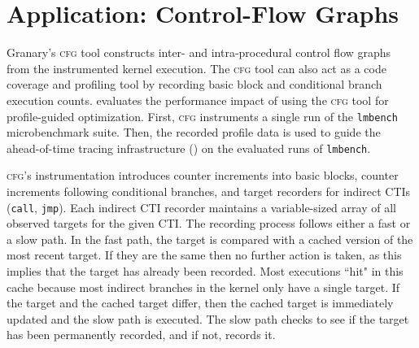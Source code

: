 \documentclass[preprint]{sigplanconf}
\newcommand{\toolname}[1]{{\scshape #1}}
\begin{document}





\section{Application: Control-Flow Graphs}\label{sec:cfg}
Granary's \toolname{cfg} tool constructs inter- and intra-procedural control flow graphs from the instrumented kernel execution. The \toolname{cfg} tool can also act as a code coverage and profiling tool by recording basic block and conditional branch execution counts.  evaluates the performance impact of using the \toolname{cfg} tool for profile-guided optimization. First, \toolname{cfg} instruments a single run of the \texttt{lmbench} microbenchmark suite. Then, the recorded profile data is used to guide the ahead-of-time tracing infrastructure () on the evaluated runs of \texttt{lmbench}.

\toolname{cfg}'s instrumentation introduces counter increments into basic blocks, counter increments following conditional branches, and target recorders for indirect CTIs (\texttt{call}, \texttt{jmp}). Each indirect CTI recorder maintains a variable-sized array of all observed targets for the given CTI. The recording process follows either a fast or a slow path. In the fast path, the target is compared with a cached version of the most recent target. If they are the same then no further action is taken, as this implies that the target has already been recorded. Most executions ``hit" in this cache because most indirect branches in the kernel only have a single target. If the target and the cached target differ, then the cached target is immediately updated and the slow path is executed. The slow path checks to see if the target has been permanently recorded, and if not, records it.
\end{document}
